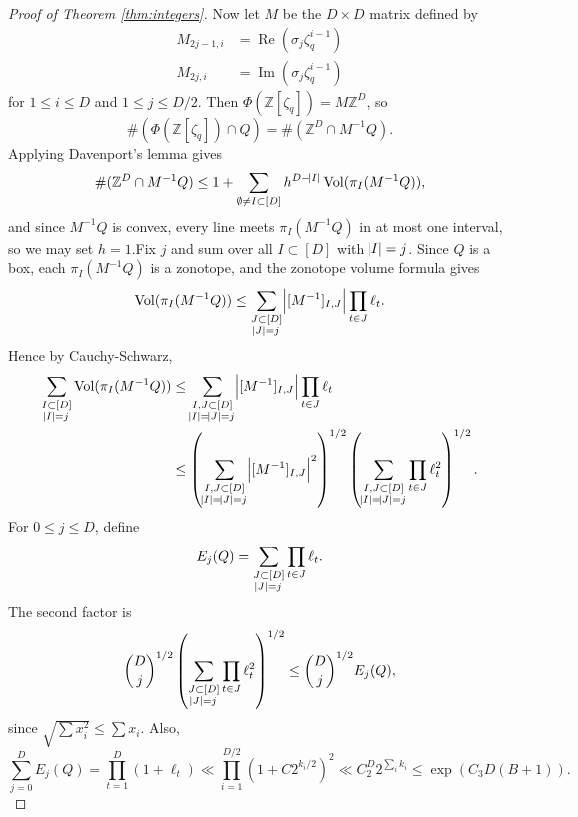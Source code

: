 \documentclass[10pt,a4paper]{amsart}
\newcommand{\bZ}{\mathbb{Z}}
\DeclareMathOperator{\Vol}{Vol}
\begin{document}
\begin{proof}[Proof of Theorem \ref{thm:integers}]
Now let $M$ be the $D \times D$ matrix defined by
\begin{align*}
M_{2j-1,i} &= \operatorname{Re}(\sigma_j \zeta_q^{i-1})
\\
M_{2j,i} &= \operatorname{Im}(\sigma_j \zeta_q^{i-1})
\end{align*}
for $1 \leq i \leq D$ and $1 \leq j \leq D/2$. Then $\Phi(\bZ[\zeta_q])=M\bZ^D$, so
\[
\#(\Phi(\bZ[\zeta_q]) \cap Q)
=
\#(\bZ^D \cap M^{-1}Q).
\]
Applying Davenport's lemma gives
\[
\#(\bZ^D \cap M^{-1}Q)
\leq
1+\sum_{\emptyset \neq I \subset [D]} h^{D-\abs{I}} \Vol(\pi_I(M^{-1}Q)),
\]
and since $M^{-1}Q$ is convex, every line meets $\pi_I(M^{-1} Q)$ in at most one interval, so we may set $h=1$.Fix $j$ and sum over all $I \subset [D]$ with $\abs{I}=j$. Since $Q$ is a box, each $\pi_I(M^{-1}Q)$ is a zonotope, and the zonotope volume formula gives
\[
\Vol(\pi_I(M^{-1}Q))
\leq
\sum_{\substack{J \subset [D] \\ \abs{J}=j}}
\abs{[M^{-1}]_{I,J}}
\prod_{t \in J} \ell_t.
\]
Hence by Cauchy-Schwarz,
\begin{align*}
\sum_{\substack{I \subset [D] \\ \abs{I}=j}} \Vol(\pi_I(M^{-1}Q))
&\leq
\sum_{\substack{I,J \subset [D] \\ \abs{I}=\abs{J}=j}}
\abs{[M^{-1}]_{I,J}}
\prod_{t \in J} \ell_t \\
&\leq
\left(
\sum_{\substack{I,J \subset [D] \\ \abs{I}=\abs{J}=j}}
\abs{[M^{-1}]_{I,J}}^2
\right)^{1/2}
\left(
\sum_{\substack{I,J \subset [D] \\ \abs{I}=\abs{J}=j}}
\prod_{t \in J} \ell_t^2
\right)^{1/2}.
\end{align*}
For $0 \leq j \leq D$, define
\[
E_j(Q)=\sum_{\substack{J \subset [D] \\ \abs{J}=j}} \prod_{t \in J} \ell_t.
\]
The second factor is
\[
\binom{D}{j}^{1/2} \left( \sum_{\substack{J \subset [D] \\ \abs{J}=j}} \prod_{t \in J} \ell_t^2 \right)^{1/2}
\leq
\binom{D}{j}^{1/2} E_j(Q),
\]
since $\sqrt{\sum x_i^2} \leq \sum x_i$.
Also,
\[
\sum_{j=0}^D E_j(Q)=\prod_{t=1}^D (1+\ell_t)
\ll
\prod_{i=1}^{D/2} (1+C 2^{k_i/2})^2
\ll
C_2^D 2^{\sum_i k_i}
\leq
\exp(C_3 D(B+1)).
\]


\end{proof}
\end{document}
